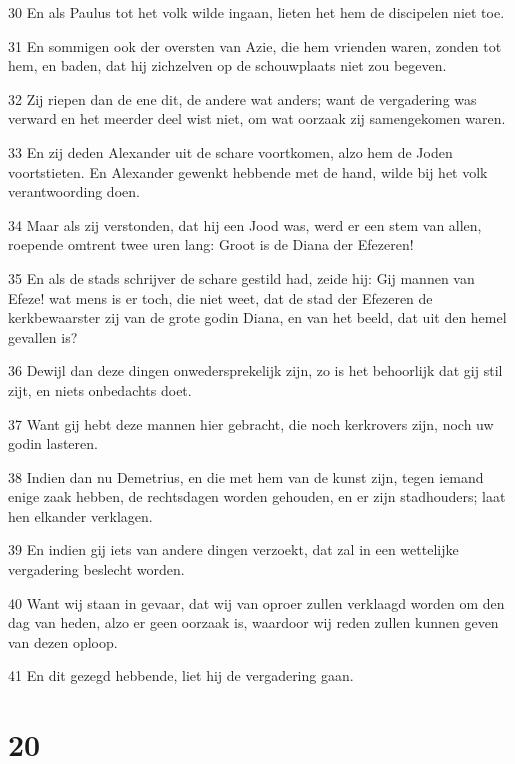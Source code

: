 \par 30 En als Paulus tot het volk wilde ingaan, lieten het hem de discipelen niet toe.
\par 31 En sommigen ook der oversten van Azie, die hem vrienden waren, zonden tot hem, en baden, dat hij zichzelven op de schouwplaats niet zou begeven.
\par 32 Zij riepen dan de ene dit, de andere wat anders; want de vergadering was verward en het meerder deel wist niet, om wat oorzaak zij samengekomen waren.
\par 33 En zij deden Alexander uit de schare voortkomen, alzo hem de Joden voortstieten. En Alexander gewenkt hebbende met de hand, wilde bij het volk verantwoording doen.
\par 34 Maar als zij verstonden, dat hij een Jood was, werd er een stem van allen, roepende omtrent twee uren lang: Groot is de Diana der Efezeren!
\par 35 En als de stads schrijver de schare gestild had, zeide hij: Gij mannen van Efeze! wat mens is er toch, die niet weet, dat de stad der Efezeren de kerkbewaarster zij van de grote godin Diana, en van het beeld, dat uit den hemel gevallen is?
\par 36 Dewijl dan deze dingen onwedersprekelijk zijn, zo is het behoorlijk dat gij stil zijt, en niets onbedachts doet.
\par 37 Want gij hebt deze mannen hier gebracht, die noch kerkrovers zijn, noch uw godin lasteren.
\par 38 Indien dan nu Demetrius, en die met hem van de kunst zijn, tegen iemand enige zaak hebben, de rechtsdagen worden gehouden, en er zijn stadhouders; laat hen elkander verklagen.
\par 39 En indien gij iets van andere dingen verzoekt, dat zal in een wettelijke vergadering beslecht worden.
\par 40 Want wij staan in gevaar, dat wij van oproer zullen verklaagd worden om den dag van heden, alzo er geen oorzaak is, waardoor wij reden zullen kunnen geven van dezen oploop.
\par 41 En dit gezegd hebbende, liet hij de vergadering gaan.

\chapter{20}

